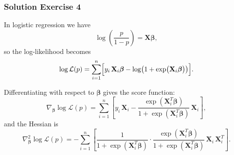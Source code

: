\documentclass{beamer}
\begin{document}
\begin{frame}
\frametitle{Solution Exercise 4}
In logistic regression we have
\[
\log\!\left(\frac{p}{1-p}\right) = \mathbf{X}\boldsymbol\beta,
\]
so the log-likelihood becomes
\[
\log\mathcal{L}(p) = \sum_{i=1}^n \Bigl[ y_i\,\mathbf{X}_i\boldsymbol\beta - \log\!\left(1+\exp\bigl(\mathbf{X}_i\boldsymbol\beta\bigr)\right) \Bigr].
\]




Differentiating with respect to \(\boldsymbol\beta\) gives the score function:
\[
\nabla_{\boldsymbol\beta} \log\mathcal{L}(p) = \sum_{i=1}^n \left[ y_i\,\mathbf{X}_i - \frac{\exp(\mathbf{X}_i^T\boldsymbol\beta)}{1+\exp(\mathbf{X}_i^T\boldsymbol\beta)}\,\mathbf{X}_i \right],
\]
and the Hessian is
\[
\nabla^2_{\boldsymbol\beta} \log\mathcal{L}(p) = -\sum_{i=1}^n \left[ \frac{1}{1+\exp(\mathbf{X}_i^T\boldsymbol\beta)} \cdot \frac{\exp(\mathbf{X}_i^T\boldsymbol\beta)}{1+\exp(\mathbf{X}_i^T\boldsymbol\beta)}\,\mathbf{X}_i\,\mathbf{X}_i^T \right].
\]


\end{frame}
\end{document}

